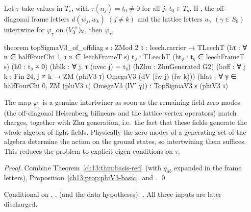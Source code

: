 \begin{theorem}\label{ch13:thm:of-offdiag}
Let $\tau$ take values in $T_s$, with $\tau(n_j)=t_0\ne0$ for all $j$, $t_0\in T_s$. If
, the off-diagonal frame letters $d(w_j,w_k)$ $(j\ne k)$ and the lattice letters
$u_\gamma$ $(\gamma\in S_0)$ intertwine for $\varphi_\tau$ on $(V_3^{+})_2$, then  $\varphi_\tau$.
\end{theorem}
\begin{leancode}
theorem topSigmaV3_of_offdiag {s : ZMod 2} {τ : leech.carrier → TLeechT}
    (hτ : ∀ n ∈ halfFourChi 1, τ n ∈ leechFrameT s) {t₀ : TLeechT} (ht₀ : t₀ ∈ leechFrameT s)
    (h0 : t₀ ≠ 0) (hblk : ∀ j, τ (nvec j) = t₀) (hZhu : ZhuGenerated G2)
    (hoff : ∀ j k : Fin 24, j ≠ k → ZM (phiV3 τ) OmegaV3 (dV (fw j) (fw k)))
    (hlat : ∀ γ ∈ halfFourChi 0, ZM (phiV3 τ) OmegaV3 (lV' γ)) :
    TopSigmaV3 s (phiV3 τ)
\end{leancode}
\begin{physics}
The map $\varphi_\tau$ is a genuine intertwiner as soon as the remaining field zero modes (the off-diagonal Heisenberg bilinears and the lattice vertex operators) match charges, together with Zhu generation, i.e.\ the fact that these fields generate the whole algebra of light fields. Physically the zero modes of a generating set of the algebra determine the action on the ground states, so intertwining them suffices. This reduces the problem to explicit eigen-conditions on $\tau$.
\end{physics}
\noindent\emph{Proof.} Combine Theorem~\ref{ch13:thm:basis-red} (with $q_{ab}$ expanded in the frame
letters), Proposition~\ref{ch13:prop:phiV3-basic}, and . \qed
\begin{status}Conditional on , ,  (and the data hypotheses);
. All three inputs are later discharged.\end{status}

